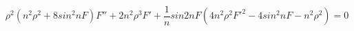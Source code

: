 \begin{equation}
\rho^2 (n^2 \rho^2 +8 sin^2nF) F'' +2n^2 \rho^3 F' + \frac{1}{n} sin2nF(4n^2\rho^2 F'^2 -4 sin^2nF- n^2\rho^2)=0  
\end{equation}

